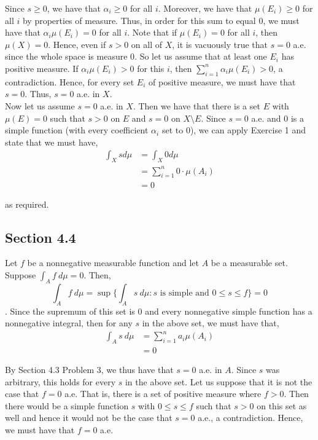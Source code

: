 \documentclass[12pt]{article}
\newenvironment{problem}[2][Problem]{\begin{trivlist}
\item[\hskip \labelsep {\bfseries #1}\hskip \labelsep {\bfseries #2.}]}{\end{trivlist}}
\begin{document}
Since $s \geq 0$, we have that $\alpha_i \geq 0$ for all $i$. Moreover, we have that $\mu(E_i) \geq 0$ for all $i$ by properties of measure. Thus, in order for this sum to equal 0, we must have that $\alpha_i \mu(E_i) = 0$ for all $i$. Note that if $\mu(E_i) = 0$ for all $i$, then $\mu(X) = 0$. Hence, even if $s > 0$ on all of $X$, it is vacuously true that $s = 0$ a.e. since the whole space is measure $0$. So let us assume that at least one $E_i$ has positive measure. If $\alpha_i \mu(E_i) > 0$ for this $i$, then 
$\sum_{i=1}^n \alpha_i \mu(E_i) > 0$, a contradiction. Hence, for every set $E_i$ of positive measure, we must have that $s = 0$. Thus, $s = 0$ a.e. in $X$.\\

Now let us assume $s = 0$ a.e. in $X$. Then we have that there is a set $E$ with $\mu(E) = 0$ such that $s > 0$ on $E$ and $s = 0$ on $X \setminus E$. Since $s = 0$ a.e. and $0$ is a simple function (with every coefficient $\alpha_i$ set to $0$), we can apply Exercise 1 and state that we must have,
\begin{align*}
\int_X s d \mu &= \int_X 0 d\mu\\
&= \sum_{i=1}^n 0 \cdot \mu(A_i)\\
&= 0
\end{align*}

as required.

\subsection{Section 4.4}

\begin{problem}{2}
\end{problem}

Let $f$ be a nonnegative measurable function and let $A$ be a measurable set. Suppose $\int_A f \ d\mu = 0$. Then, $$\int_A f \ d\mu = \sup \{ \int_A s \ d\mu: s \text{ is simple and } 0 \leq s \leq f\} = 0$$. Since the supremum of this set is $0$ and every nonnegative simple function has a nonnegative integral, then for any $s$ in the above set, we must have that,
\begin{align*}
\int_A s \ d\mu &= \sum_{i=1}^n a_i\mu(A_i)\\
&= 0
\end{align*}

By Section 4.3 Problem 3, we thus have that $s = 0$ a.e. in $A$. Since $s$ was arbitrary, this holds for every $s$ in the above set. Let us suppose that it is not the case that $f = 0$ a.e. That is, there is a set of positive measure where $f > 0$. Then there would be a simple function $s$ with $0 \leq s \leq f$ such that $s > 0$ on this set as well and hence it would not be the case that $s = 0$ a.e., a contradiction. Hence, we must have that $f = 0$ a.e.\\
\end{document}
